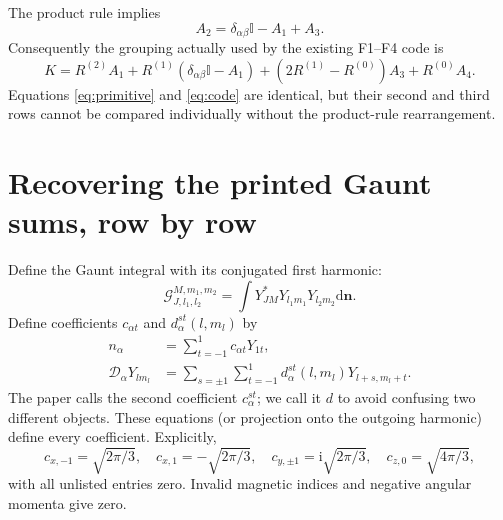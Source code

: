 \documentclass[11pt]{article}
\newcommand{\dd}{\mathrm d}
\newcommand{\ii}{\mathrm i}
\newcommand{\Id}{\mathbb I}
\begin{document}
The product rule implies
\begin{equation}
 A_2=\delta_{\alpha\beta}\Id-A_1+A_3.
\end{equation}
Consequently the grouping actually used by the existing F1--F4 code is
\begin{equation}\label{eq:code}
 \boxed{K=R^{(2)}A_1+R^{(1)}(\delta_{\alpha\beta}\Id-A_1)
 +(2R^{(1)}-R^{(0)})A_3+R^{(0)}A_4.}
\end{equation}
Equations \eqref{eq:primitive} and \eqref{eq:code} are identical, but their second and third rows cannot be compared individually without the product-rule rearrangement.

\section{Recovering the printed Gaunt sums, row by row}
Define the Gaunt integral with its conjugated first harmonic:
\begin{equation}
 \mathcal G^{M,m_1,m_2}_{J,l_1,l_2}
 =\int Y_{JM}^*Y_{l_1m_1}Y_{l_2m_2}\dd\bm n.
\end{equation}
Define coefficients $c_{\alpha t}$ and $d_\alpha^{st}(l,m_l)$ by
\begin{align}
 n_\alpha&=\sum_{t=-1}^1c_{\alpha t}Y_{1t},\\
 \mathcal D_\alpha Y_{lm_l}&=\sum_{s=\pm1}\sum_{t=-1}^1d_\alpha^{st}(l,m_l)Y_{l+s,m_l+t}.
\end{align}
The paper calls the second coefficient $c_\alpha^{st}$; we call it $d$ to avoid confusing two different objects. These equations (or projection onto the outgoing harmonic) define every coefficient. Explicitly,
\begin{equation}
 c_{x,-1}=\sqrt{2\pi/3},\quad c_{x,1}=-\sqrt{2\pi/3},\quad
 c_{y,\pm1}=\ii\sqrt{2\pi/3},\quad c_{z,0}=\sqrt{4\pi/3},
\end{equation}
with all unlisted entries zero. Invalid magnetic indices and negative angular momenta give zero.
\end{document}
